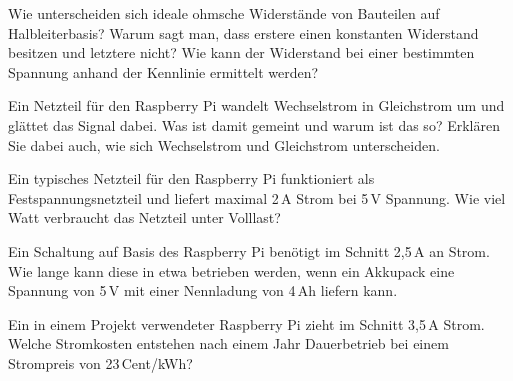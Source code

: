 \bigskip
\teilaufgabe
Wie unterscheiden sich ideale ohmsche Widerstände von Bauteilen auf Halbleiterbasis?
Warum sagt man, dass erstere einen konstanten Widerstand besitzen und letztere nicht?
Wie kann der Widerstand bei einer bestimmten Spannung anhand der Kennlinie ermittelt
werden?

\teilaufgabe
Ein Netzteil für den Raspberry Pi wandelt Wechselstrom in Gleichstrom um und
glättet das Signal dabei. Was ist damit gemeint und warum ist das so? Erklären
Sie dabei auch, wie sich Wechselstrom und Gleichstrom unterscheiden.

\teilaufgabe
Ein typisches Netzteil für den Raspberry Pi funktioniert als Festspannungsnetzteil
und liefert maximal 2\,A Strom bei 5\,V Spannung. Wie viel Watt verbraucht das Netzteil
unter Volllast?

\bigskip
\teilaufgabe
Ein Schaltung auf Basis des Raspberry Pi benötigt im Schnitt 2,5\,A an Strom.
Wie lange kann diese in etwa betrieben werden, wenn ein Akkupack eine Spannung
von 5\,V mit einer Nennladung von 4\,Ah liefern kann.

\bigskip
\teilaufgabe
Ein in einem Projekt verwendeter Raspberry Pi zieht im Schnitt 3,5\,A Strom.
Welche Stromkosten entstehen nach einem Jahr Dauerbetrieb bei einem Strompreis
von 23\,Cent/kWh?




